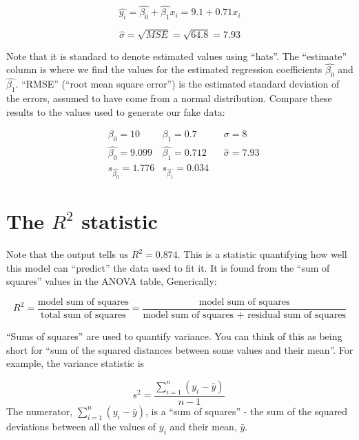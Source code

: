 \documentclass[
  letterpaper,
  DIV=11,
  numbers=noendperiod]{scrreprt}
\begin{document}
\[
\hat{y_i}=\hat{\beta_0}+\hat{\beta_1}x_i=9.1+0.71x_i
\]

\[
\hat{\sigma}=\sqrt{MSE}=\sqrt{64.8}=7.93
\]

Note that it is standard to denote estimated values using ``hats''. The
``estimate'' column is where we find the values for the estimated
regression coefficients \(\hat{\beta_0}\) and \(\hat{\beta_1}\).
``RMSE'' (``root mean square error'') is the estimated standard
deviation of the errors, assumed to have come from a normal
distribution. Compare these results to the values used to generate our
fake data:

\[
\begin{align}
&\beta_0=10 &\beta_1=0.7 \quad &\sigma=8 \\
&\hat{\beta_0}=9.099 &\hat{\beta_1}=0.712 \quad &\hat{\sigma}=7.93 \\
&s_{\hat{\beta_0}}=1.776 &s_{\hat{\beta_1}}=0.034
\end{align}
\]

\hypertarget{the-r2-statistic}{%
\section{\texorpdfstring{The \(R^2\)
statistic}{The R\^{}2 statistic}}\label{the-r2-statistic}}

Note that the output tells us \(R^2=0.874\). This is a statistic
quantifying how well this model can ``predict'' the data used to fit it.
It is found from the ``sum of squares'' values in the ANOVA table,
Generically:

\[
R^2=\frac{\text{model sum of squares}}{\text{total sum of squares}}=\frac{\text{model sum of squares}}{\text{model sum of squares + residual sum of squares}}
\]

\begin{tcolorbox}[enhanced jigsaw, bottomtitle=1mm, coltitle=black, breakable, colback=white, colbacktitle=quarto-callout-note-color!10!white, colframe=quarto-callout-note-color-frame, rightrule=.15mm, opacitybacktitle=0.6, arc=.35mm, opacityback=0, titlerule=0mm, toprule=.15mm, bottomrule=.15mm, toptitle=1mm, title=\textcolor{quarto-callout-note-color}{\faInfo}\hspace{0.5em}{Note}, leftrule=.75mm, left=2mm]

``Sums of squares'' are used to quantify variance. You can think of this
as being short for ``sum of the squared distances between some values
and their mean''. For example, the variance statistic is

\[
s^2=\frac{\sum_{i=1}^n (y_i-\bar{y})}{n-1}\
\] The numerator, \(\sum_{i=1}^n (y_i-\bar{y})\), is a ``sum of
squares'' - the sum of the squared deviations between all the values of
\(y_i\) and their mean, \(\bar{y}\).

\end{tcolorbox}
\end{document}
